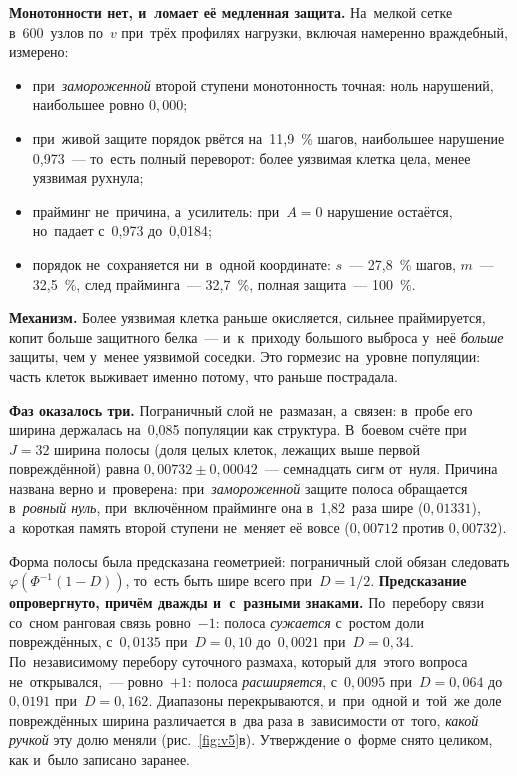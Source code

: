 \documentclass[11pt,a4paper,landscape,twocolumn]{article}
\begin{document}
\textbf{Монотонности нет, и~ломает её медленная защита.} На~мелкой сетке в~600~узлов по~$v$ при~трёх профилях нагрузки, включая намеренно враждебный, измерено:
\begin{itemize}[leftmargin=1.1em,itemsep=1pt,topsep=2pt]
\item при~\emph{замороженной} второй ступени монотонность точная: ноль нарушений, наибольшее ровно $0{,}000$;
\item при~живой защите порядок рвётся на~11,9~\% шагов, наибольшее нарушение 0,973~— то~есть полный переворот: более уязвимая клетка цела, менее уязвимая рухнула;
\item прайминг не~причина, а~усилитель: при~$A=0$ нарушение остаётся, но~падает с~0,973 до~0,0184;
\item порядок не~сохраняется ни~в~одной координате: $s$~— 27,8~\% шагов, $m$~— 32,5~\%, след прайминга~— 32,7~\%, полная защита~— 100~\%.
\end{itemize}

\textbf{Механизм.} Более уязвимая клетка раньше окисляется, сильнее праймируется, копит больше защитного белка~— и~к~приходу большого выброса у~неё \emph{больше} защиты, чем у~менее уязвимой соседки. Это гормезис на~уровне популяции: часть клеток выживает именно потому, что раньше пострадала.

\textbf{Фаз оказалось три.} Пограничный слой не~размазан, а~связен: в~пробе его ширина держалась на~0,085 популяции как структура. В~боевом счёте при~$J=32$ ширина полосы (доля целых клеток, лежащих выше первой повреждённой) равна $0{,}00732\pm0{,}00042$~— семнадцать сигм от~нуля. Причина названа верно и~проверена: при~\emph{замороженной} защите полоса обращается в~\emph{ровный нуль}, при~включённом прайминге она в~1,82~раза шире ($0{,}01331$), а~короткая память второй ступени не~меняет её вовсе ($0{,}00712$ против $0{,}00732$).

\begin{ineq}
Форма полосы была предсказана геометрией: пограничный слой обязан следовать $\varphi(\Phi^{-1}(1-D))$, то~есть быть шире всего при~$D=1/2$. \textbf{Предсказание опровергнуто, причём дважды и~с~разными знаками.} По~перебору связи со~сном ранговая связь ровно~$-1$: полоса \emph{сужается} с~ростом доли повреждённых, с~$0{,}0135$ при~$D=0{,}10$ до~$0{,}0021$ при~$D=0{,}34$. По~независимому перебору суточного размаха, который для~этого вопроса не~открывался,~— ровно~$+1$: полоса \emph{расширяется}, с~$0{,}0095$ при~$D=0{,}064$ до~$0{,}0191$ при~$D=0{,}162$. Диапазоны перекрываются, и~при~одной и~той~же доле повреждённых ширина различается в~два раза в~зависимости от~того, \emph{какой ручкой} эту долю меняли (рис.~\ref{fig:v5}в). Утверждение о~форме снято целиком, как и~было записано заранее.
\end{ineq}
\end{document}
